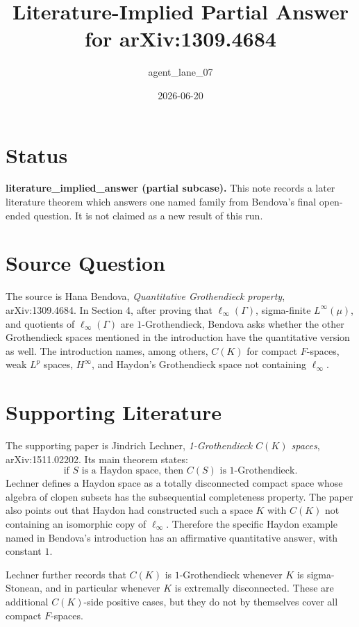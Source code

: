 \documentclass[11pt]{article}
\title{Literature-Implied Partial Answer for arXiv:1309.4684}
\author{agent\_lane\_07}
\date{2026-06-20}
\begin{document}
\maketitle

\section*{Status}

\textbf{literature\_implied\_answer (partial subcase).}
This note records a later literature theorem which answers one named family
from Bendova's final open-ended question. It is not claimed as a new result of
this run.

\section*{Source Question}

The source is Hana Bendova, \emph{Quantitative Grothendieck property},
arXiv:1309.4684. In Section 4, after proving that
\(\ell_\infty(\Gamma)\), sigma-finite \(L^\infty(\mu)\), and quotients of
\(\ell_\infty(\Gamma)\) are \(1\)-Grothendieck, Bendova asks whether the
other Grothendieck spaces mentioned in the introduction have the quantitative
version as well. The introduction names, among others, \(C(K)\) for compact
\(F\)-spaces, weak \(L^p\) spaces, \(H^\infty\), and Haydon's Grothendieck
space not containing \(\ell_\infty\).

\section*{Supporting Literature}

The supporting paper is Jindrich Lechner, \emph{1-Grothendieck \(C(K)\)
spaces}, arXiv:1511.02202. Its main theorem states:
\[
  \text{if } S \text{ is a Haydon space, then } C(S) \text{ is }
  1\text{-Grothendieck.}
\]
Lechner defines a Haydon space as a totally disconnected compact space whose
algebra of clopen subsets has the subsequential completeness property. The
paper also points out that Haydon had constructed such a space \(K\) with
\(C(K)\) not containing an isomorphic copy of \(\ell_\infty\). Therefore the
specific Haydon example named in Bendova's introduction has an affirmative
quantitative answer, with constant \(1\).

Lechner further records that \(C(K)\) is \(1\)-Grothendieck whenever \(K\) is
sigma-Stonean, and in particular whenever \(K\) is extremally disconnected.
These are additional \(C(K)\)-side positive cases, but they do not by
themselves cover all compact \(F\)-spaces.
\end{document}
